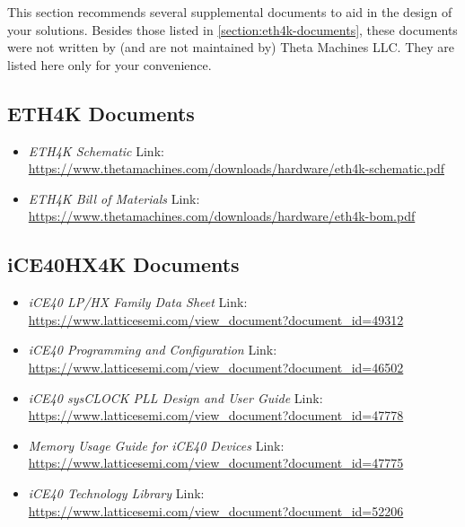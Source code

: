 
This section recommends several supplemental documents to aid in the design of your solutions. Besides those listed in \autoref{section:eth4k-documents}, these documents were not written by (and are not maintained by) Theta Machines LLC. They are listed here only for your convenience. 

\subsection{ETH4K Documents} \label{section:eth4k-documents}
\begin{itemize}
    \item \textit{ETH4K Schematic} \newline
    Link: \url{https://www.thetamachines.com/downloads/hardware/eth4k-schematic.pdf}
    
    \item \textit{ETH4K Bill of Materials} \newline
    Link: \url{https://www.thetamachines.com/downloads/hardware/eth4k-bom.pdf}
\end{itemize}

\subsection{iCE40HX4K Documents}
\begin{itemize}
    \item \textit{iCE40 LP/HX Family Data Sheet} \newline
    Link: \url{https://www.latticesemi.com/view_document?document_id=49312}
    
    \item \textit{iCE40 Programming and Configuration} \newline
    Link: \url{https://www.latticesemi.com/view_document?document_id=46502}
    
    \item \textit{iCE40 sysCLOCK PLL Design and User Guide} \newline
    Link: \url{https://www.latticesemi.com/view_document?document_id=47778}
    
    \item \textit{Memory Usage Guide for iCE40 Devices} \newline
    Link: \url{https://www.latticesemi.com/view_document?document_id=47775}

    \item \textit{iCE40 Technology Library} \newline
    Link: \url{https://www.latticesemi.com/view_document?document_id=52206}
\end{itemize}

